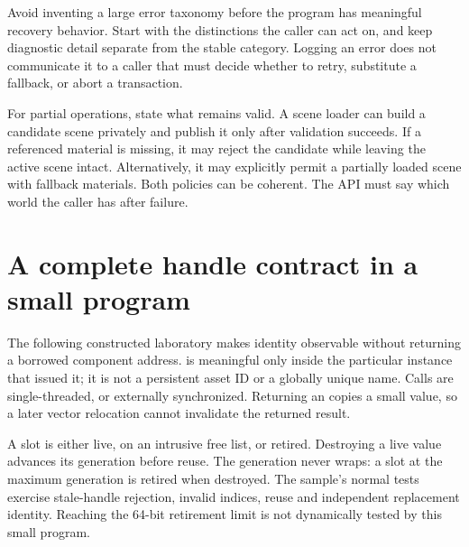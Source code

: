 Avoid inventing a large error taxonomy before the program has meaningful recovery behavior. Start with the distinctions the caller can act on, and keep diagnostic detail separate from the stable category. Logging an error does not communicate it to a caller that must decide whether to retry, substitute a fallback, or abort a transaction.

For partial operations, state what remains valid. A scene loader can build a candidate scene privately and publish it only after validation succeeds. If a referenced material is missing, it may reject the candidate while leaving the active scene intact. Alternatively, it may explicitly permit a partially loaded scene with fallback materials. Both policies can be coherent. The API must say which world the caller has after failure.

\section{A complete handle contract in a small program}\label{05-engine-i-ch008-a-complete-handle-contract-in-a-small-program}

\hypertarget{05-engine-i-ch008-a-complete-handle-contract-in-a-small-program}{}

The following constructed laboratory makes identity observable without returning a borrowed component address.  is meaningful only inside the particular  instance that issued it; it is not a persistent asset ID or a globally unique name. Calls are single-threaded, or externally synchronized. Returning an  copies a small value, so a later vector relocation cannot invalidate the returned result.

A slot is either live, on an intrusive free list, or retired. Destroying a live value advances its generation before reuse. The generation never wraps: a slot at the maximum generation is retired when destroyed. The sample's normal tests exercise stale-handle rejection, invalid indices, reuse and independent replacement identity. Reaching the 64-bit retirement limit is not dynamically tested by this small program.

